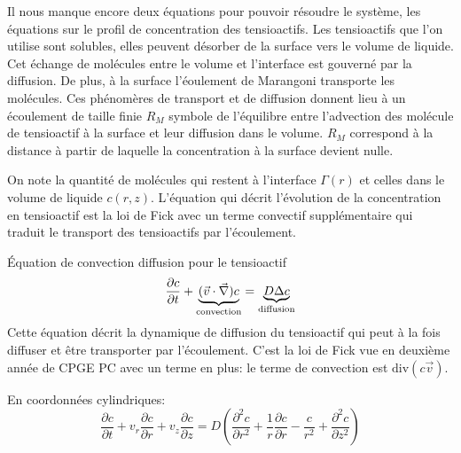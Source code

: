 \documentclass[french, 10pt]{article}
\begin{document}


Il nous manque encore deux équations pour pouvoir résoudre le système, les équations sur le profil de concentration des tensioactifs. Les tensioactifs que l'on utilise sont solubles, elles peuvent désorber de la surface vers le volume de liquide. Cet échange de molécules entre le volume et l'interface est gouverné par la diffusion. De plus, à la surface l'éoulement de Marangoni transporte les molécules. Ces phénomères de transport et de diffusion donnent lieu à un écoulement de taille finie $R_M$ symbole de l'équilibre entre l'advection des molécule de tensioactif à la surface et leur diffusion dans le volume. $R_M$ correspond à la distance à partir de laquelle la concentration à la surface devient nulle.\bigskip 


On note la quantité de molécules qui restent à l'interface $\Gamma(r)$ et celles dans le volume de liquide $c(r,z)$. L'équation qui décrit l'évolution de la concentration en tensioactif est la loi de Fick avec un terme convectif supplémentaire qui traduit le transport des tensioactifs par l'écoulement.\medskip

\begin{Programme}{Équation de convection diffusion pour le tensioactif}
  \begin{equation}
    \dfrac{\partial c}{\partial t}+ \underbrace{(\vec{v}\cdot \vec{\nabla})c}_{\text{convection}}=\underbrace{D\Delta c}_{\rm diffusion}
  \end{equation}
  Cette équation décrit la dynamique de diffusion du tensioactif qui peut à la fois diffuser et être transporter par l'écoulement. C'est la loi de Fick vue en deuxième année de CPGE PC avec un terme en plus: le terme de convection est $\text{div}(c\vec{v})$.
\end{Programme} 
% 
En coordonnées cylindriques:
\begin{equation}
  \frac{\partial c}{\partial t}+v_r\frac{\partial c}{\partial r}+v_z\frac{\partial c}{\partial z}=D\left(\frac{\partial ^2 c}{\partial r^2}+\frac{1}{r}\frac{\partial c}{\partial r}-\frac{c}{r^2}+\frac{\partial ^2 c}{\partial z^2}\right)\label{eq:transporttensioactif}
  \end{equation}
\end{document}

